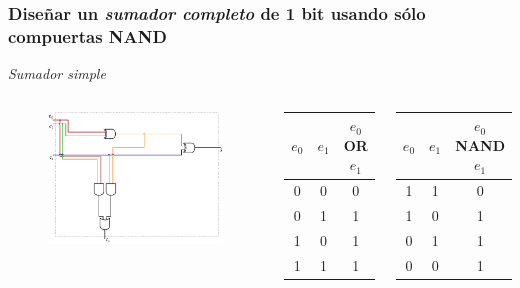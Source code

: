 \documentclass[mathserif,hyperref]{beamer}
\begin{document}
\begin{frame}[t]
\frametitle{\small Diseñar un \textit{sumador completo} de 1 bit usando sólo
compuertas NAND}
\textit{Sumador simple}
\begin{columns}[T]
  \begin{figure}[htp]
    \includegraphics[scale=0.6]{sumador-completo.pdf}
  \end{figure}

  \begin{center}\begin{tabular}{| c | c || c |}
    \hline
    $e_0$ & $e_1$ & $e_0$ OR $e_1$ \\ \hline
      0   &   0   &        0       \\
      0   &   1   &        1       \\
      1   &   0   &        1       \\
      1   &   1   &        1       \\
    \hline
  \end{tabular}\end{center}
  \pause
  \begin{center}\begin{tabular}{| c | c || c |}
    \hline
    $e_0$ & $e_1$ & $e_0$ NAND $e_1$ \\ \hline
      1   &   1   &         0        \\
      1   &   0   &         1        \\
      0   &   1   &         1        \\
      0   &   0   &         1        \\
    \hline
  \end{tabular}\end{center}
\end{columns}
\end{frame}
\end{document}
